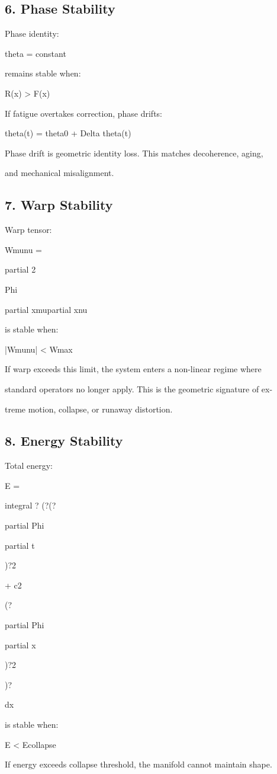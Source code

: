 \documentclass[10pt]{article}
\begin{document}
\subsection*{6. Phase Stability}
Phase identity:

theta = constant

remains stable when:

R(x) > F(x)

If fatigue overtakes correction, phase drifts:

theta(t) = theta0 + Delta theta(t)

Phase drift is geometric identity loss. This matches decoherence, aging,

and mechanical misalignment.

\subsection*{7. Warp Stability}
Warp tensor:

Wmunu =

partial 2

Phi

partial xmupartial xnu

is stable when:

|Wmunu| < Wmax

If warp exceeds this limit, the system enters a non-linear regime where

standard operators no longer apply. This is the geometric signature of ex-

treme motion, collapse, or runaway distortion.

\subsection*{8. Energy Stability}
Total energy:

E =

integral ? (?(?

partial Phi

partial t

)?2

+ c2

(?

partial Phi

partial x

)?2

)?

dx

is stable when:

E < Ecollapse


If energy exceeds collapse threshold, the manifold cannot maintain shape.
\end{document}
